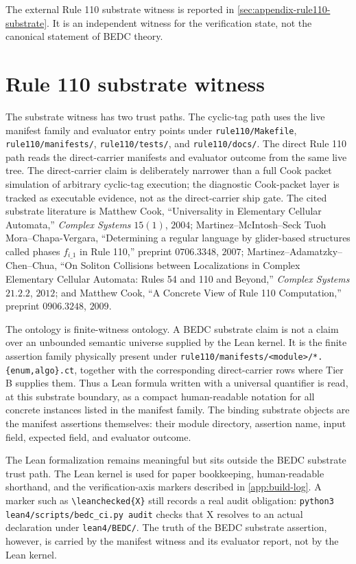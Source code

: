 The external Rule 110 substrate witness is reported in \autoref{sec:appendix-rule110-substrate}. It is an independent witness for the verification state, not the canonical statement of BEDC theory.

\section{Rule 110 substrate witness}
\label{sec:appendix-rule110-substrate}

The substrate witness has two trust paths. The cyclic-tag path uses the live manifest family and evaluator entry points under \texttt{rule110/Makefile}, \texttt{rule110/manifests/}, \texttt{rule110/tests/}, and \texttt{rule110/docs/}. The direct Rule 110 path reads the direct-carrier manifests and evaluator outcome from the same live tree. The direct-carrier claim is deliberately narrower than a full Cook packet simulation of arbitrary cyclic-tag execution; the diagnostic Cook-packet layer is tracked as executable evidence, not as the direct-carrier ship gate. The cited substrate literature is Matthew Cook, ``Universality in Elementary Cellular Automata,'' \emph{Complex Systems} $15(1)$, $2004$; Martinez--McIntosh--Seck Tuoh Mora--Chapa-Vergara, ``Determining a regular language by glider-based structures called phases $f_{i\_1}$ in Rule 110,'' preprint $0706.3348$, $2007$; Martinez--Adamatzky--Chen--Chua, ``On Soliton Collisions between Localizations in Complex Elementary Cellular Automata: Rules 54 and 110 and Beyond,'' \emph{Complex Systems} $21.2.2$, $2012$; and Matthew Cook, ``A Concrete View of Rule 110 Computation,'' preprint $0906.3248$, $2009$.

The ontology is finite-witness ontology. A BEDC substrate claim is not a claim over an unbounded semantic universe supplied by the Lean kernel. It is the finite assertion family physically present under \texttt{rule110/manifests/<module>/*.\{enum,algo\}.ct}, together with the corresponding direct-carrier rows where Tier B supplies them. Thus a Lean formula written with a universal quantifier is read, at this substrate boundary, as a compact human-readable notation for all concrete instances listed in the manifest family. The binding substrate objects are the manifest assertions themselves: their module directory, assertion name, input field, expected field, and evaluator outcome.

The Lean formalization remains meaningful but sits outside the BEDC substrate trust path. The Lean kernel is used for paper bookkeeping, human-readable shorthand, and the verification-axis markers described in \autoref{app:build-log}. A marker such as \texttt{\textbackslash leanchecked\{X\}} still records a real audit obligation: \texttt{python3 lean4/scripts/bedc\_ci.py audit} checks that X resolves to an actual declaration under \texttt{lean4/BEDC/}. The truth of the BEDC substrate assertion, however, is carried by the manifest witness and its evaluator report, not by the Lean kernel.

